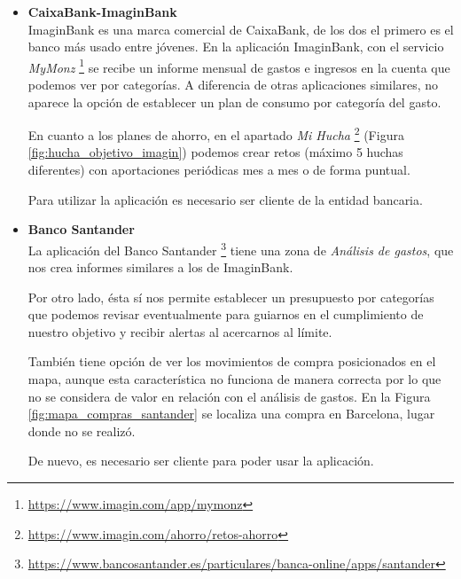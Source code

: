 \begin{itemize}

    \item \textbf{CaixaBank-ImaginBank} \\
    ImaginBank es una marca comercial de CaixaBank, de los dos el primero es el banco más usado entre jóvenes. 
    En la aplicación ImaginBank, con el servicio \textit{MyMonz} \footnote{\url{https://www.imagin.com/app/mymonz}}
    se recibe un informe mensual de gastos e ingresos en la cuenta que podemos ver por categorías. 
    A diferencia de otras aplicaciones similares, no aparece la opción de 
    establecer un plan de consumo por categoría del gasto.

    En cuanto a los planes de ahorro, en el apartado \textit{Mi Hucha}
    \footnote{\url{https://www.imagin.com/ahorro/retos-ahorro}} (Figura \ref{fig:hucha_objetivo_imagin}) podemos crear 
    retos (máximo 5 huchas diferentes) con aportaciones periódicas mes a mes o de forma puntual.

    Para utilizar la aplicación es necesario ser cliente de la entidad bancaria.

    \item \textbf{Banco Santander}\\
    La aplicación del Banco Santander \footnote{\url{https://www.bancosantander.es/particulares/banca-online/apps/santander}}
    tiene una zona de \textit{Análisis de gastos}, que nos crea informes similares a los de ImaginBank. 

    Por otro lado, ésta sí nos permite establecer un 
    presupuesto por categorías que podemos revisar eventualmente para guiarnos en el 
    cumplimiento de nuestro objetivo y recibir alertas al acercarnos al límite.

    También tiene opción de ver los movimientos de compra posicionados en el mapa, aunque esta característica no funciona de manera correcta por lo que no se considera de valor en relación con el análisis de gastos. En la Figura \ref{fig:mapa_compras_santander} se localiza una compra en Barcelona, lugar donde no se realizó.

    De nuevo, es necesario ser cliente para poder usar la aplicación.\\


\end{itemize}
